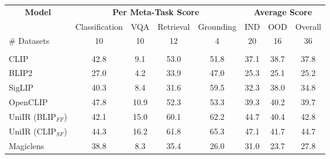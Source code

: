 \documentclass[11pt]{article}
\begin{document}
\begin{table}[t]
\centering
\setlength\tabcolsep{6pt}%
\renewcommand\arraystretch{1.2}
\small
\fontsize{8pt}{8pt}\selectfont
\begin{tabular}{lccccccc}
\toprule
\multicolumn{1}{c}{\multirow{2}{*}{\textbf{Model}}} & \multicolumn{4}{c}{\textbf{Per Meta-Task Score}}               & \multicolumn{3}{c}{\textbf{Average Score}}    \\ \cline{2-8} 
\multicolumn{1}{c}{}                                & Classification & VQA           & Retrieval     & Grounding     & IND           & OOD           & Overall       \\ \midrule
\# Datasets                                         & 10             & 10            & 12            & 4             & 20            & 16            & 36            \\ \midrule
\rowcolor[HTML]{EDEDED}
\multicolumn{8}{c}{\textit{Baselines}}                                                                                                                                         \\ \midrule
CLIP \cite{CLIP}                                                & 42.8           & 9.1           & 53.0          & 51.8          & 37.1          & 38.7          & 37.8          \\
BLIP2 \cite{BLIP2}                                              & 27.0           & 4.2           & 33.9          & 47.0          & 25.3          & 25.1          & 25.2          \\
SigLIP \cite{SigLIP}                                             & 40.3           & 8.4           & 31.6          & 59.5          & 32.3          & 38.0          & 34.8          \\
OpenCLIP \cite{DBLP:conf/cvpr/ChertiBWWIGSSJ23}                                            & 47.8           & 10.9          & 52.3          & 53.3          & 39.3          & 40.2          & 39.7          \\
UniIR (BLIP$_{FF}$) \cite{Uniir}                               & 42.1           & 15.0          & 60.1          & 62.2          & 44.7          & 40.4          & 42.8          \\
UniIR (CLIP$_{SF}$) \cite{Uniir}                                & 44.3           & 16.2          & 61.8          & 65.3          & 47.1          & 41.7          & 44.7          \\
Magiclens \cite{Magiclens}                                          & 38.8           & 8.3           & 35.4          & 26.0          & 31.0          & 23.7          & 27.8          \\ \midrule

\end{tabular}
\end{table}
\end{document}

